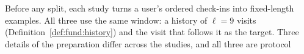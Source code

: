 Before any split, each study turns a user's ordered check-ins into fixed-length
examples. All three use the same window: a history of $\ell=9$ visits
(Definition~\ref{def:fund:history}) and the visit that follows it as the target. Three
details of the preparation differ across the studies, and all three are protocol
